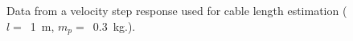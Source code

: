 
\begin{figure}
    \captionsetup[subfigure]{justification=centering}
    \centering
    \caption{Data from a velocity step response used for cable length estimation 
    ($l =$~\SI{1}{\metre}, $m_p =$~\SI{0.3}{\kilo\gram}.).}
    \label{fig:FFT_vel_step_subfigs}  
\end{figure}